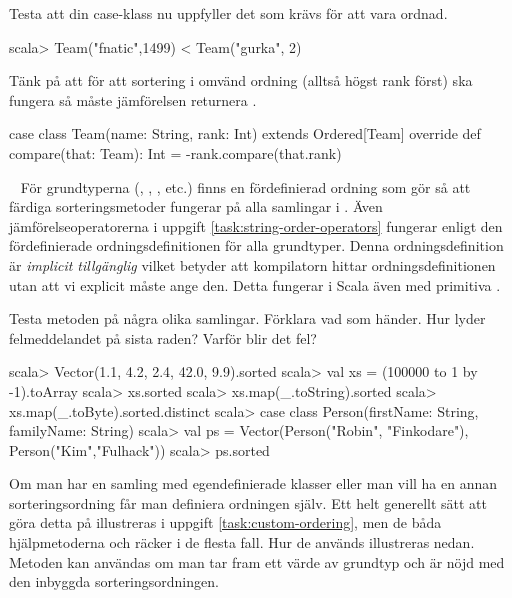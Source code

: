 \Subtask Testa att  din case-klass nu uppfyller det som krävs för att vara ordnad.
\begin{REPL}
scala> Team("fnatic",1499) < Team("gurka", 2)
\end{REPL}


\SOLUTION


\TaskSolved \what


Tänk på att för att sortering i omvänd ordning (alltså högst rank först) ska fungera så måste jämförelsen returnera .

\begin{CodeSmall}
case class  Team(name: String, rank: Int) extends Ordered[Team]{
  override def compare(that: Team): Int = -rank.compare(that.rank)
}
\end{CodeSmall}



\QUESTEND




\QUESTBEGIN

\Task  \what~  För grundtyperna (, , , etc.) finns en fördefinierad ordning som gör så att färdiga sorteringsmetoder fungerar på alla samlingar i . Även jämförelseoperatorerna i uppgift \ref{task:string-order-operators} fungerar enligt den fördefinierade ordningsdefinitionen för alla grundtyper. Denna ordningsdefinition är \textit{implicit tillgänglig} vilket betyder att kompilatorn hittar ordningsdefinitionen utan att vi explicit måste ange den. Detta fungerar i Scala även med primitiva .

\Subtask Testa metoden  på några olika samlingar. Förklara vad som händer. Hur lyder felmeddelandet på sista raden? Varför blir det fel?

\begin{REPL}
scala> Vector(1.1, 4.2, 2.4, 42.0, 9.9).sorted
scala> val xs = (100000 to 1 by -1).toArray
scala> xs.sorted
scala> xs.map(_.toString).sorted
scala> xs.map(_.toByte).sorted.distinct
scala> case class Person(firstName: String, familyName: String)
scala> val ps = Vector(Person("Robin", "Finkodare"), Person("Kim","Fulhack"))
scala> ps.sorted
\end{REPL}

\Subtask Om man har en samling med egendefinierade klasser eller man vill ha en annan sorteringsordning får man definiera ordningen själv. Ett helt generellt sätt att göra detta på  illustreras i uppgift \ref{task:custom-ordering}, men de båda hjälpmetoderna  och  räcker i de flesta fall. Hur de används illustreras nedan. Metoden  kan användas om man tar fram ett värde av grundtyp och är nöjd med den inbyggda sorteringsordningen.

